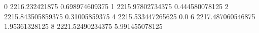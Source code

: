 0 2216.232421875 0.698974609375
1 2215.97802734375 0.444580078125
2 2215.843505859375 0.31005859375
4 2215.533447265625 0.0
6 2217.487060546875 1.95361328125
8 2221.52490234375 5.991455078125
